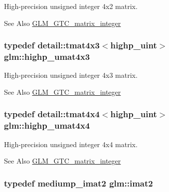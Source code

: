 High-\/precision unsigned integer 4x2 matrix. 

\begin{DoxySeeAlso}{See Also}
\hyperlink{group__gtc__matrix__integer}{G\-L\-M\-\_\-\-G\-T\-C\-\_\-matrix\-\_\-integer} 
\end{DoxySeeAlso}
\hypertarget{group__gtc__matrix__integer_ga6de5237bcae8a908a095d97d3ca74bdd}{
\subsubsection[{highp\-\_\-umat4x3}]{\setlength{\rightskip}{0pt plus 5cm}typedef detail\-::tmat4x3$<$highp\-\_\-uint$>$ {\bf glm\-::highp\-\_\-umat4x3}}}\label{group__gtc__matrix__integer_ga6de5237bcae8a908a095d97d3ca74bdd}


High-\/precision unsigned integer 4x3 matrix. 

\begin{DoxySeeAlso}{See Also}
\hyperlink{group__gtc__matrix__integer}{G\-L\-M\-\_\-\-G\-T\-C\-\_\-matrix\-\_\-integer} 
\end{DoxySeeAlso}
\hypertarget{group__gtc__matrix__integer_ga8600f9e6e566b3dee70de37dafd2bd8c}{
\subsubsection[{highp\-\_\-umat4x4}]{\setlength{\rightskip}{0pt plus 5cm}typedef detail\-::tmat4x4$<$highp\-\_\-uint$>$ {\bf glm\-::highp\-\_\-umat4x4}}}\label{group__gtc__matrix__integer_ga8600f9e6e566b3dee70de37dafd2bd8c}


High-\/precision unsigned integer 4x4 matrix. 

\begin{DoxySeeAlso}{See Also}
\hyperlink{group__gtc__matrix__integer}{G\-L\-M\-\_\-\-G\-T\-C\-\_\-matrix\-\_\-integer} 
\end{DoxySeeAlso}
\hypertarget{group__gtc__matrix__integer_ga77a581b3366fb63fc72f8f20830003e0}{
\subsubsection[{imat2}]{\setlength{\rightskip}{0pt plus 5cm}typedef mediump\-\_\-imat2 {\bf glm\-::imat2}}}\label{group__gtc__matrix__integer_ga77a581b3366fb63fc72f8f20830003e0}


